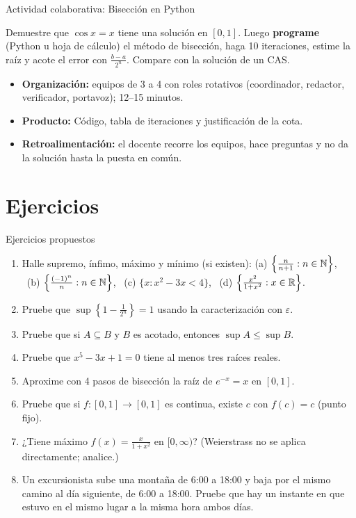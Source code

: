 \documentclass[10pt,aspectratio=169]{beamer}
\begin{document}
\begin{frame}{Actividad colaborativa: Bisección en Python}
  \small
  \begin{activa}
    Demuestre que $\cos x=x$ tiene una solución en $[0,1]$. Luego \textbf{programe} (Python u hoja de cálculo) el método de bisección, haga 10 iteraciones, estime la raíz y acote el error con $\frac{b-a}{2^n}$. Compare con la solución de un CAS.
  \end{activa}
  \begin{itemize}
    \item \textbf{Organización:} equipos de 3 a 4 con roles rotativos (coordinador, redactor, verificador, portavoz); 12--15 minutos.
    \item \textbf{Producto:} Código, tabla de iteraciones y justificación de la cota.
    \item \textbf{Retroalimentación:} el docente recorre los equipos, hace preguntas y no da la solución hasta la puesta en común.
  \end{itemize}
\end{frame}

\section{Ejercicios}

\begin{frame}{Ejercicios propuestos}
  \small
  \begin{ejercicio}
    \begin{enumerate}
      \item Halle supremo, ínfimo, máximo y mínimo (si existen): (a) $\left\{\frac{n}{n+1}:n\in\mathbb{N}\right\}$, \ (b) $\left\{\frac{(-1)^n}{n}:n\in\mathbb{N}\right\}$,
        \ (c) $\{x:x^2-3x<4\}$, \ (d) $\left\{\frac{x^2}{1+x^2}:x\in\mathbb{R}\right\}$.
      \item Pruebe que $\sup\left\{1-\frac1{2^n}\right\}=1$ usando la caracterización con $\varepsilon$.
      \item Pruebe que si $A\subseteq B$ y $B$ es acotado, entonces $\sup A\le\sup B$.
      \item Pruebe que $x^5-3x+1=0$ tiene al menos tres raíces reales.
      \item Aproxime con 4 pasos de bisección la raíz de $e^{-x}=x$ en $[0,1]$.
      \item Pruebe que si $f:[0,1]\to[0,1]$ es continua, existe $c$ con $f(c)=c$ (punto fijo).
      \item ¿Tiene máximo $f(x)=\frac{x}{1+x^2}$ en $[0,\infty)$? (Weierstrass no se aplica directamente; analice.)
      \item Un excursionista sube una montaña de 6:00 a 18:00 y baja por el mismo camino al día siguiente, de 6:00 a 18:00. Pruebe que hay
        un instante en que estuvo en el mismo lugar a la misma hora ambos días.
    \end{enumerate}
  \end{ejercicio}
\end{frame}
\end{document}
